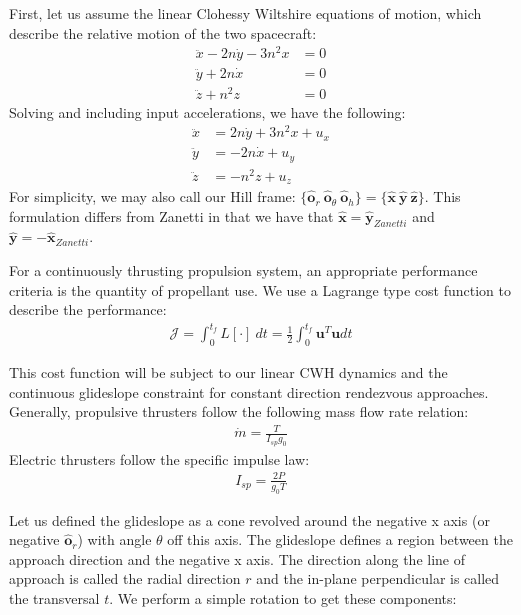\documentclass[conf]{new-aiaa}
\begin{document}
\begin{singlespace}
First, let us assume the linear Clohessy Wiltshire equations of motion, which describe the relative motion of the two spacecraft:
\begin{align}
    \ddot{x} - 2n\dot{y} -3n^2x &= 0 \\
    \ddot{y} + 2n\dot{x} &= 0 \\
    \ddot{z} + n^2z &=0 
\end{align}
Solving and including input accelerations, we have the following:
\begin{align}
    \ddot{x} &= 2n\dot{y} + 3n^2x + u_x \\
    \ddot{y} &= - 2n\dot{x} + u_y \\
    \ddot{z} &= - n^2z + u_z 
\end{align}
For simplicity, we may also call our Hill frame: $\{\bm{\hat{o}}_r \ \bm{\hat{o}}_\theta \ \bm{\hat{o}}_h\} = \{\bm{\hat{x}} \ \bm{\hat{y}} \ \bm{\hat{z}}\}$. This formulation differs from Zanetti in that we have that $\bm{\hat{x}}= \bm{\hat{y}}_{Zanetti}$ and $\bm{\hat{y}}= -\bm{\hat{x}}_{Zanetti}$.

For a continuously thrusting propulsion system, an appropriate performance criteria is the quantity of propellant use. We use a Lagrange type cost function to describe the performance:
\begin{align}
    \mathcal{J} = \int_0^{t_f} L[\cdot] \  dt = \frac{1}{2}\int_0^{t_f} \mathbf{u}^T \mathbf{u} dt
\end{align}

This cost function will be subject to our linear CWH dynamics and the continuous glideslope constraint for constant direction rendezvous approaches. Generally, propulsive thrusters follow the following mass flow rate relation:
\begin{align}
    \dot{m}= \frac{T}{I_{sp}g_0} 
\end{align}
Electric thrusters follow the specific impulse law:
\begin{align}
    I_{sp} = \frac{2P}{g_0T}
\end{align}

Let us defined the glideslope as a cone revolved around the negative x axis (or negative $\bm{\hat{o}}_r$) with angle $\theta$ off this axis. The glideslope defines a region between the approach direction and the negative x axis. The direction along the line of approach is called the radial direction $r$ and the in-plane perpendicular is called the transversal $t$. We perform a simple rotation to get these components:


\end{singlespace}
\end{document}
